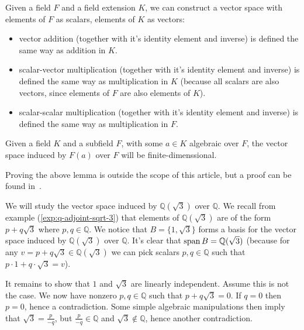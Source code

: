 \begin{lemma}\label{lem:field-extension-vector-space}
  Given a field $F$ and a field extension $K$, we can construct a vector space with elements of $F$ as scalars, elements of $K$ as vectors:
  \begin{itemize}
    \item vector addition (together with it's identity element and inverse) is defined the same way as addition in $K$. 
    \item scalar-vector multiplication (together with it's identity element and inverse) is defined the same way as multiplication in $K$ (because all scalars are also vectors, since elements of $F$ are also elements of $K$).
    \item scalar-scalar multiplication (together with it's identity element and inverse) is defined the same way as multiplication in $F$.
  \end{itemize}
\end{lemma}

\begin{lemma}\label{lem:algebraic-field-finite-vector-space}
   Given a field $K$ and a subfield $F$, with some $a \in K$ algebraic over $F$, the vector space induced by $F(a) $ over $F$ will be finite-dimenssional.
\end{lemma}

Proving the above lemma is outside the scope of this article, but a proof can be found in~\cite{milne2022}.

\begin{exmp}
  We will study the vector space induced by $\mathbb{Q} (\sqrt 3)$ over $\mathbb{Q}$. We recall from example (\ref{exp:q-adjoint-sqrt-3}) that elements of $\mathbb{Q} (\sqrt 3)$ are of the form $p + q \sqrt 3$ where $p, q \in \mathbb{Q}$. We notice that $B = \{1, \sqrt 3\}$ forms a basis for the vector space induced by $\mathbb{Q} (\sqrt 3)$ over $\mathbb{Q} $. It's clear that $\operatorname{span} B = \mathbb{Q} (\sqrt 3)$ (because for any $v = p + q \sqrt 3 \in \mathbb{Q} (\sqrt 3)$ we can pick scalars $p, q \in \mathbb{Q} $ such that $p \cdot 1 + q \cdot \sqrt 3 = v$). 

  It remains to show that $1$ and $\sqrt 3$ are linearly independent. Assume this is not the case. We now have nonzero $p, q \in \mathbb{Q} $ such that $p + q \sqrt 3 = 0$. If $q = 0$ then $p = 0$, hence a contradiction. Some simple algebraic manipulations then imply that $\sqrt 3  = \frac p {-q}$, but $\frac p {-q} \in \mathbb{Q} $ and $\sqrt 3 \not\in \mathbb{Q} $, hence another contradiction.
\end{exmp}
